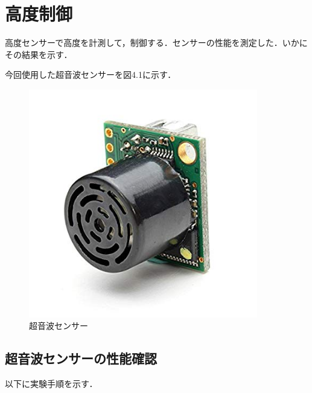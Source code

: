 \chapter{高度制御}

高度センサーで高度を計測して，制御する．センサーの性能を測定した．いかにその結果を示す．

今回使用した超音波センサーを図4.1に示す．
\begin{figure}[htbp]
  \begin{center}
   \includegraphics[width=100mm]{img/超音波センサー.jpg}
    \end{center}
  \caption{超音波センサー}
 \label{fig:ensyu3tex}
\end{figure}


\section{超音波センサーの性能確認}

以下に実験手順を示す．

